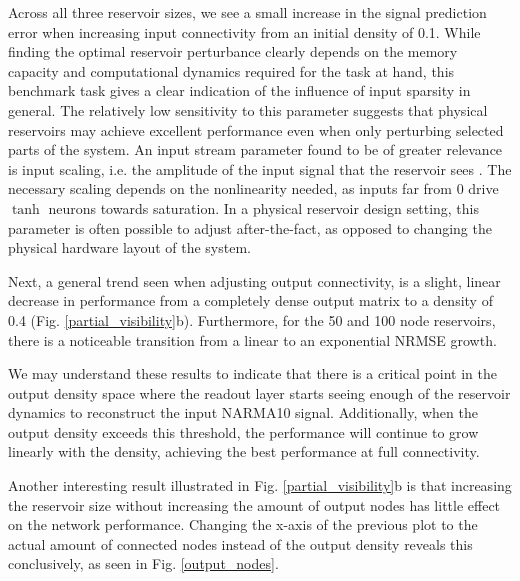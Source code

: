 Across all three reservoir sizes, we see a small increase in the signal
prediction error when increasing input connectivity from an initial density of
0.1. While finding the optimal reservoir perturbance clearly depends on the
memory capacity and computational dynamics required for the task at hand, this
benchmark task gives a clear indication of the influence of input sparsity in
general. The relatively low sensitivity to this parameter suggests that physical
reservoirs may achieve excellent performance even when only perturbing selected
parts of the system. An input stream parameter found to be of greater relevance
is input scaling, i.e. the amplitude of the input signal that the reservoir sees
\cite{alippi_quantification_2009}. The necessary scaling depends on the
nonlinearity needed, as inputs far from 0 drive $\tanh$ neurons towards
saturation. In a physical reservoir design setting, this parameter is often
possible to adjust after-the-fact, as opposed to changing the physical hardware
layout of the system.

Next, a general trend seen when adjusting output connectivity, is a slight,
linear decrease in performance from a completely dense output matrix to a
density of 0.4 (Fig. \ref{partial_visibility}b). Furthermore, for the 50 and 100
node reservoirs, there is a noticeable transition from a linear to an
exponential NRMSE growth.

We may understand these results to indicate that there is a critical point in
the output density space where the readout layer starts seeing enough of the
reservoir dynamics to reconstruct the input NARMA10 signal. Additionally, when
the output density exceeds this threshold, the performance will continue to grow
linearly with the density, achieving the best performance at full connectivity.

Another interesting result illustrated in Fig. \ref{partial_visibility}b is that
increasing the reservoir size without increasing the amount of output nodes has
little effect on the network performance. Changing the x-axis of the previous
plot to the actual amount of connected nodes instead of the output density
reveals this conclusively, as seen in Fig. \ref{output_nodes}.

